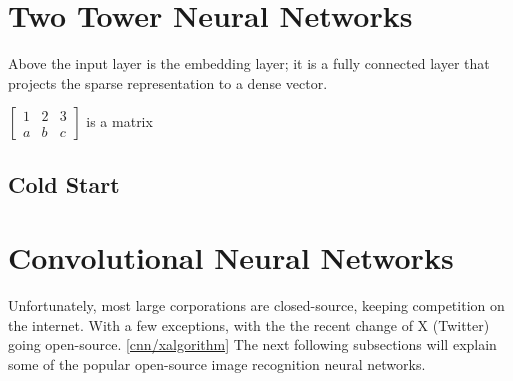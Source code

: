 \section{Two Tower Neural Networks} \label{nn}

Above the input layer is the embedding layer; it is a fully
connected layer that projects the sparse representation to
a dense vector.  \cite{10.1145/3038912.3052569} \cite{DBLP:journals/corr/abs-1708-05027}    

$\begin{bmatrix}
1 & 2 & 3\\
a & b & c
\end{bmatrix} $ is a matrix

\subsection{Cold Start}\label{cold-start}

\begin{comment}
\noindent\rule{2cm}{0.4pt}

aTwo tower neural network architecture 
User embedding
Post embedding
embedding = vector
normalize vector
dot product of post and user vector
pre trained embeddings

\noindent\rule{2cm}{0.4pt}
\end{comment}

\section{Convolutional Neural Networks}

Unfortunately, most large corporations are closed-source, keeping competition on the internet. With a few exceptions, with the the recent change of X (Twitter) going open-source. \ref{cnn/xalgorithm} The next following subsections will explain some of the popular open-source image recognition neural networks.

\begin{comment}








\end{comment}